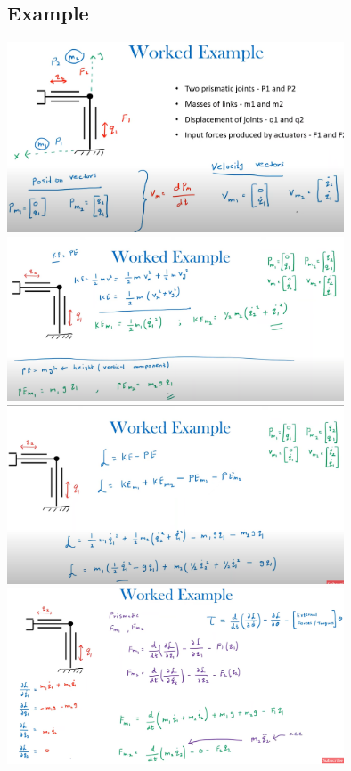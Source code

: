 \documentclass{article}
\begin{document}
\subsection{Example}
\includegraphics[width=10cm]{part1_lagrange.png}\\
\includegraphics[width=10cm]{part2_lagrange.png}\\
\includegraphics[width=10cm]{part3_lagrange.png}\\
\includegraphics[width=10cm]{part4_lagrange.png}
\end{document}
